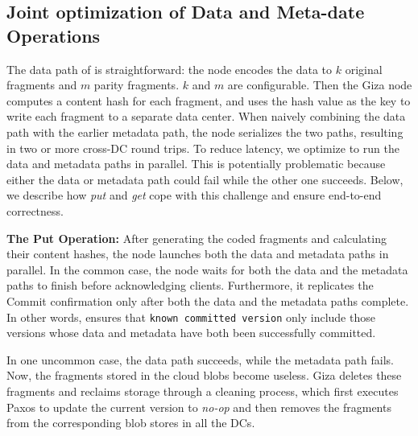 \subsection{Joint optimization of Data and Meta-date Operations}

The data path of \name is straightforward: the \name node encodes the data to $k$ original
fragments and $m$ parity fragments. $k$ and $m$ are configurable. Then the Giza node
computes a content hash for each fragment, and uses the hash value as the key to
write each fragment to a separate data center.
When naively combining the data path with the earlier metadata path,
the \name node serializes the two paths, resulting in two or more cross-DC round trips.
To reduce latency, we optimize \name to run the data and metadata paths in parallel.
This is potentially problematic because either the data or metadata path could fail
while the other one succeeds.
Below, we describe how {\em put} and {\em get} cope with this challenge and ensure end-to-end correctness.


{\bf The Put Operation:}
After generating the coded fragments and calculating their content hashes,
the \name node launches both the data and metadata paths in parallel.
In the common case,
the \name node waits for both the data and the metadata paths to finish before acknowledging clients.
Furthermore, it replicates the Commit confirmation only after both the data and the metadata paths complete. 
In other words, \name ensures that {\tt known committed version} only include those versions
whose data and metadata have both been successfully committed.

In one uncommon case, the data path succeeds, while the metadata path fails.
Now, the fragments stored in the cloud blobs become useless.
Giza deletes these fragments and reclaims storage through a cleaning process,
which first executes Paxos to update the current version to {\em no-op}
and then removes the fragments from the corresponding blob stores in all the DCs.

